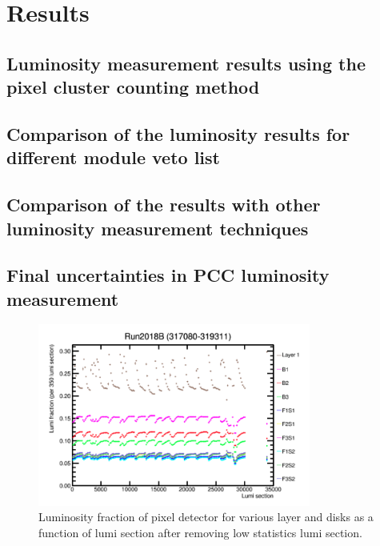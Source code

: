 \chapter{Results}  %

\ifpdf
    \graphicspath{{Chapter1/Figs/Raster/}{Chapter1/Figs/PDF/}{Chapter1/Figs/}}
\else
    \graphicspath{{Chapter1/Figs/Vector/}{Chapter1/Figs/}}
\fi


\section{Luminosity measurement results using the pixel cluster counting method}
\section{Comparison of the luminosity results for different module veto list}
\section{Comparison of the results with other luminosity measurement techniques}
\section{Final uncertainties in PCC luminosity measurement}



\begin{figure}[!htp]
\centering
\includegraphics[width=0.8\textwidth]{ashish_thesis/pcc_stability_begin.png}
\caption{%
   Luminosity fraction of pixel detector for various layer and disks as a function of lumi section after removing low statistics lumi section.
}
\label{fig:PCC_stab_begin}
\end{figure}




